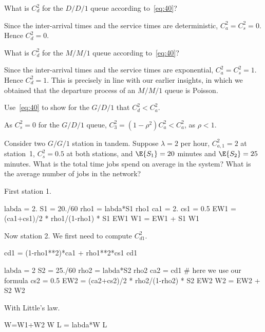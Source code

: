 \begin{exercise}
What is $C_d^2$ for the $D/D/1$ queue according to~\eqref{eq:40}?
\begin{solution}
  Since the inter-arrival times and the service times are deterministic, $C_a^2=C_s^2=0$. Hence $C_d^2=0$. 
\end{solution}
\end{exercise}

\begin{exercise}
What is $C_d^2$ for the $M/M/1$ queue according to~\eqref{eq:40}?  

\begin{solution}
  Since the inter-arrival times and the service times are exponential, $C_a^2=C_s^2=1$. Hence $C_d^2=1$. This is precisely in line with our earlier insights, in which we obtained that the departure process of an $M/M/1$ queue is Poisson.
\end{solution}
\end{exercise}

\begin{exercise}
  Use~\eqref{eq:40} to show for the $G/D/1$ that $C_d^2 < C_a^2$. 
  \begin{solution}
As $C_s^2 = 0$ for the $G/D/1$ queue, $C_3^2 = (1-\rho^2) C_a^2 < C_a^2$, as $\rho<1$. 
  \end{solution}
\end{exercise}

\begin{exercise}
Consider two $G/G/1$ station in tandem. Suppose $\lambda=2$ per hour, $C_{a,1}^2=2$ at station~1, $C_s^2=0.5$ at both stations, and $\E{S_1}=20$ minutes and $\E{S_2}=25$ minutes. What is the total time jobs spend on average in the system? What is the average number of jobs in the network?

\begin{solution}
First station 1.
\begin{pyconsole}
labda = 2.
S1 = 20./60
rho1 = labda*S1
rho1
ca1 = 2.
cs1 = 0.5
EW1 = (ca1+cs1)/2 * rho1/(1-rho1) * S1
EW1
W1 = EW1 + S1
W1
\end{pyconsole}

Now station 2. We first need to compute $C_{d1}^2$. 

\begin{pyconsole}
cd1 = (1-rho1**2)*ca1 + rho1**2*cs1
cd1
\end{pyconsole}


\begin{pyconsole}
labda = 2
S2 = 25./60
rho2 = labda*S2
rho2
ca2 = cd1 # here we use our formula
cs2 = 0.5
EW2 = (ca2+cs2)/2 * rho2/(1-rho2) * S2
EW2
W2 = EW2 + S2
W2
\end{pyconsole}

With Little's law.
\begin{pyconsole}
W=W1+W2
W
L = labda*W
L
\end{pyconsole}


\end{solution}
\end{exercise}

